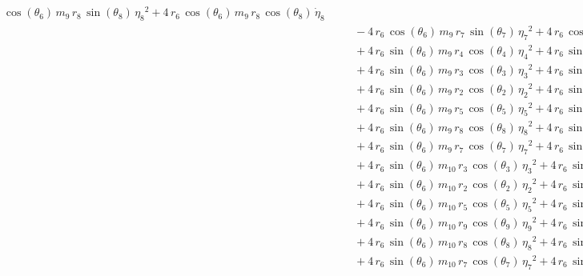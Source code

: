 \begin{eqnarray*}
{}\,\cos({\theta_{6}})\,m_{9}\,r_{8}\,\sin({\theta_{8}})\,{{\eta_{8}}}^
2 + 4\,r_{6}\,\cos({\theta_{6}})\,m_{9}\,r_{8}\,\cos({\theta_{8}})\,{
\dot{\eta}_{8}} \\ &&\quad\mbox{} - 4\,r_{6}\,\cos({\theta_{6}})\,m_{9
}\,r_{7}\,\sin({\theta_{7}})\,{{\eta_{7}}}^2 + 4\,r_{6}\,\cos({\theta
_{6}})\,m_{9}\,r_{7}\,\cos({\theta_{7}})\,{\dot{\eta}_{7}}
 \\ &&\quad\mbox{} + 4\,r_{6}\,\sin({\theta_{6}})\,m_{9}\,r_{4}\,\cos(
{\theta_{4}})\,{{\eta_{4}}}^2 + 4\,r_{6}\,\sin({\theta_{6}})\,m_{9}\,r
_{4}\,\sin({\theta_{4}})\,{\dot{\eta}_{4}} \\ &&\quad\mbox{} + 4\,r_{6
}\,\sin({\theta_{6}})\,m_{9}\,r_{3}\,\cos({\theta_{3}})\,{{\eta_{3}}}^
2 + 4\,r_{6}\,\sin({\theta_{6}})\,m_{9}\,r_{3}\,\sin({\theta_{3}})\,{
\dot{\eta}_{3}} \\ &&\quad\mbox{} + 4\,r_{6}\,\sin({\theta_{6}})\,m_{9
}\,r_{2}\,\cos({\theta_{2}})\,{{\eta_{2}}}^2 + 4\,r_{6}\,\sin({\theta
_{6}})\,m_{9}\,r_{2}\,\sin({\theta_{2}})\,{\dot{\eta}_{2}}
 \\ &&\quad\mbox{} + 4\,r_{6}\,\sin({\theta_{6}})\,m_{9}\,r_{5}\,\cos(
{\theta_{5}})\,{{\eta_{5}}}^2 + 4\,r_{6}\,\sin({\theta_{6}})\,m_{9}\,r
_{5}\,\sin({\theta_{5}})\,{\dot{\eta}_{5}} \\ &&\quad\mbox{} + 4\,r_{6
}\,\sin({\theta_{6}})\,m_{9}\,r_{8}\,\cos({\theta_{8}})\,{{\eta_{8}}}^
2 + 4\,r_{6}\,\sin({\theta_{6}})\,m_{9}\,r_{8}\,\sin({\theta_{8}})\,{
\dot{\eta}_{8}} \\ &&\quad\mbox{} + 4\,r_{6}\,\sin({\theta_{6}})\,m_{9
}\,r_{7}\,\cos({\theta_{7}})\,{{\eta_{7}}}^2 + 4\,r_{6}\,\sin({\theta
_{6}})\,m_{9}\,r_{7}\,\sin({\theta_{7}})\,{\dot{\eta}_{7}}
 \\ &&\quad\mbox{} + 4\,r_{6}\,\sin({\theta_{6}})\,m_{10}\,r_{3}\,\cos
({\theta_{3}})\,{{\eta_{3}}}^2 + 4\,r_{6}\,\sin({\theta_{6}})\,m_{10}
\,r_{3}\,\sin({\theta_{3}})\,{\dot{\eta}_{3}} \\ &&\quad\mbox{} + 4\,r
_{6}\,\sin({\theta_{6}})\,m_{10}\,r_{2}\,\cos({\theta_{2}})\,{{\eta_{2
}}}^2 + 4\,r_{6}\,\sin({\theta_{6}})\,m_{10}\,r_{2}\,\sin({\theta_{2}}
)\,{\dot{\eta}_{2}} \\ &&\quad\mbox{} + 4\,r_{6}\,\sin({\theta_{6}})\,
m_{10}\,r_{5}\,\cos({\theta_{5}})\,{{\eta_{5}}}^2 + 4\,r_{6}\,\sin({
\theta_{6}})\,m_{10}\,r_{5}\,\sin({\theta_{5}})\,{\dot{\eta}_{5}}
 \\ &&\quad\mbox{} + 4\,r_{6}\,\sin({\theta_{6}})\,m_{10}\,r_{9}\,\cos
({\theta_{9}})\,{{\eta_{9}}}^2 + 4\,r_{6}\,\sin({\theta_{6}})\,m_{10}
\,r_{9}\,\sin({\theta_{9}})\,{\dot{\eta}_{9}} \\ &&\quad\mbox{} + 4\,r
_{6}\,\sin({\theta_{6}})\,m_{10}\,r_{8}\,\cos({\theta_{8}})\,{{\eta_{8
}}}^2 + 4\,r_{6}\,\sin({\theta_{6}})\,m_{10}\,r_{8}\,\sin({\theta_{8}}
)\,{\dot{\eta}_{8}} \\ &&\quad\mbox{} + 4\,r_{6}\,\sin({\theta_{6}})\,
m_{10}\,r_{7}\,\cos({\theta_{7}})\,{{\eta_{7}}}^2 + 4\,r_{6}\,\sin({
\theta_{6}})\,m_{10}\,r_{7}\,\sin({\theta_{7}})\,{\dot{\eta}_{7}}
 \end{eqnarray*}
